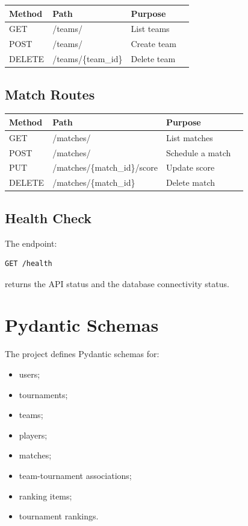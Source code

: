 \documentclass[11pt,a4paper]{article}
\begin{document}
\begin{longtable}{llll}
\toprule
\textbf{Method} & \textbf{Path} & \textbf{Purpose}\\
\midrule
GET & /teams/ & List teams\\
POST & /teams/ & Create team\\
DELETE & /teams/\{team\_id\} & Delete team\\
\bottomrule
\end{longtable}

\subsection{Match Routes}

\begin{longtable}{llll}
\toprule
\textbf{Method} & \textbf{Path} & \textbf{Purpose}\\
\midrule
GET & /matches/ & List matches\\
POST & /matches/ & Schedule a match\\
PUT & /matches/\{match\_id\}/score & Update score\\
DELETE & /matches/\{match\_id\} & Delete match\\
\bottomrule
\end{longtable}

\subsection{Health Check}

The endpoint:

\begin{lstlisting}
GET /health
\end{lstlisting}

returns the API status and the database connectivity status.

\section{Pydantic Schemas}

The project defines Pydantic schemas for:

\begin{itemize}
    \item users;
    \item tournaments;
    \item teams;
    \item players;
    \item matches;
    \item team-tournament associations;
    \item ranking items;
    \item tournament rankings.
\end{itemize}
\end{document}
